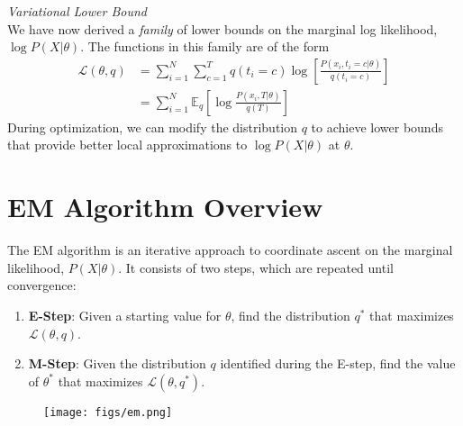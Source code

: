 \documentclass[11pt]{article}
\newenvironment{summary}[1][Summary]{
    \begin{trivlist}
    \item[\hskip \labelsep {\bfseries #1}]
}{\end{trivlist}}
\begin{document}
\begin{framed}
    \vspace{-5mm}
    \begin{summary} \textit{Variational Lower Bound}\\
        We have now derived a \emph{family} of lower bounds on the marginal log
        likelihood, $\log P(X | \theta)$. The functions in this family are of
        the form
        \begin{align*}
            \mathcal{L}(\theta, q) &= \sum_{i=1}^N \sum_{c=1}^T q(t_i = c) \log
            \left[ \frac{P(x_i, t_i = c | \theta)}{q(t_i = c)} \right]\\
            &= \sum_{i=1}^N \mathbb{E}_{q} \left[\log \frac{P(x_i, T | \theta)}{q(T)}\right]
        \end{align*}
        During optimization, we can modify the distribution $q$ to achieve
        lower bounds that provide better local approximations to $\log
        P(X|\theta)$ at $\theta$.
    \end{summary}
    \vspace{-2mm}
\end{framed}

\section*{EM Algorithm Overview}
The EM algorithm is an iterative approach to coordinate ascent on the marginal
likelihood, $P(X|\theta)$. It consists of two steps, which are repeated until
convergence:
\begin{enumerate}
    \item \textbf{E-Step}: Given a starting value for $\theta$, find the
        distribution $q^*$ that maximizes $\mathcal{L}(\theta, q)$.
    \item \textbf{M-Step}: Given the distribution $q$ identified during the
        E-step, find the value of $\theta^*$ that maximizes $\mathcal{L}(\theta,
        q^*)$.
\end{enumerate}

\begin{figure}[htpb]
    \centering
    \texttt{[image: figs/em.png]}
\end{figure}
\end{document}
